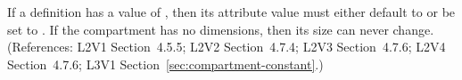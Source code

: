If a \Compartment definition has a  value of
, then its  attribute value must either default to or be
set to .  If the compartment has no dimensions, then its size can
never change.  (References: L2V1 Section~4.5.5; L2V2 Section~4.7.4; L2V3
Section~4.7.6; L2V4 Section~4.7.6; L3V1 Section~\ref{sec:compartment-constant}.)
